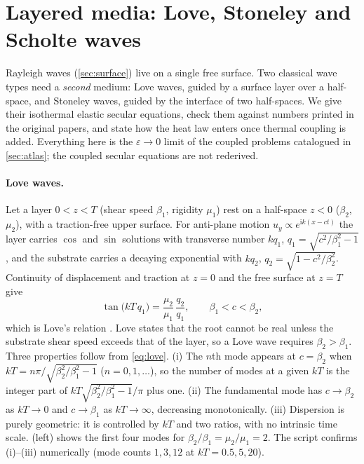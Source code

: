 \section{Layered media: Love, Stoneley and Scholte waves}\label{sec:layered}
Rayleigh waves (\cref{sec:surface}) live on a single free surface. Two classical wave types need a \emph{second} medium: Love waves, guided by a surface layer over a half-space, and Stoneley waves, guided by the interface of two half-spaces. We give their isothermal elastic secular equations, check them against numbers printed in the original papers, and state how the heat law enters once thermal coupling is added. Everything here is the $\varepsilon\to0$ limit of the coupled problems catalogued in \cref{sec:atlas}; the coupled secular equations are not rederived.

\paragraph{Love waves.} Let a layer $0<z<T$ (shear speed $\beta_1$, rigidity $\mu_1$) rest on a half-space $z<0$ ($\beta_2$, $\mu_2$), with a traction-free upper surface. For anti-plane motion $u_y\propto e^{\mathrm i k(x-ct)}$ the layer carries $\cos$ and $\sin$ solutions with transverse number $kq_1$, $q_1=\sqrt{c^2/\beta_1^2-1}$, and the substrate carries a decaying exponential with $kq_2$, $q_2=\sqrt{1-c^2/\beta_2^2}$. Continuity of displacement and traction at $z=0$ and the free surface at $z=T$ give
\begin{equation}
\tan\!\big(kT\,q_1\big)=\frac{\mu_2}{\mu_1}\,\frac{q_2}{q_1},\qquad \beta_1<c<\beta_2 ,\label{eq:love}
\end{equation}
which is Love's relation \citep[eq.~(40), p.~162]{Love1911}. Love states that the root cannot be real unless the substrate shear speed exceeds that of the layer, so a Love wave requires $\beta_2>\beta_1$. Three properties follow from \eqref{eq:love}. (i) The $n$th mode appears at $c=\beta_2$ when $kT=n\pi/\sqrt{\beta_2^2/\beta_1^2-1}$ ($n=0,1,\dots$), so the number of modes at a given $kT$ is the integer part of $kT\sqrt{\beta_2^2/\beta_1^2-1}/\pi$ plus one. (ii) The fundamental mode has $c\to\beta_2$ as $kT\to0$ and $c\to\beta_1$ as $kT\to\infty$, decreasing monotonically. (iii) Dispersion is purely geometric: it is controlled by $kT$ and two ratios, with no intrinsic time scale. (left) shows the first four modes for $\beta_2/\beta_1=\mu_2/\mu_1=2$. The script  confirms (i)--(iii) numerically (mode counts $1,3,12$ at $kT=0.5,5,20$).

